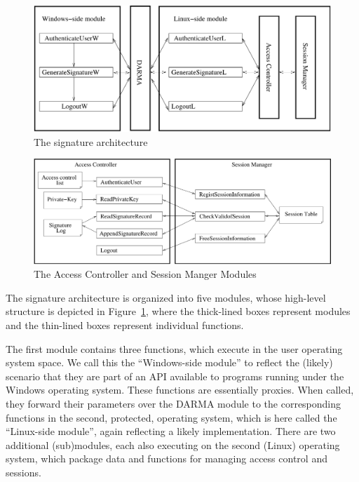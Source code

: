 \documentclass[a4paper,pdftex]{article}
\newcommand{\sigsys}{signature architecture}
\begin{document}
\begin{figure}[t]
\begin{center}
\includegraphics[scale=.55]{fig/signature-architecture} %
\end{center}
\caption{The \sigsys{}  \label{sigsys-fig}}
\end{figure}
\begin{figure}[t]
\begin{center}
\includegraphics[scale=.44]{fig/darma-sub}
\end{center}
\caption{The Access Controller and Session Manger Modules \label{submod-fig}}
\end{figure}


The \sigsys{} is organized into five modules, whose high-level structure
is depicted in Figure~\ref{sigsys-fig}, where the thick-lined boxes
represent modules and the thin-lined boxes represent individual functions. 

The first module contains three functions, which execute in
the user operating system space.  We call this the ``Windows-side
module'' to reflect the (likely) scenario that they are part of an API
available to programs running under the Windows operating system.  These
functions are essentially proxies.  When called, they forward their
parameters over the DARMA module to the corresponding functions in the
second, protected, operating system, which is here called the
``Linux-side module'', again reflecting a likely implementation.  There
are two additional (sub)modules, each also executing on the second (Linux)
operating system, which package data and functions for managing access
control and sessions.
\end{document}
